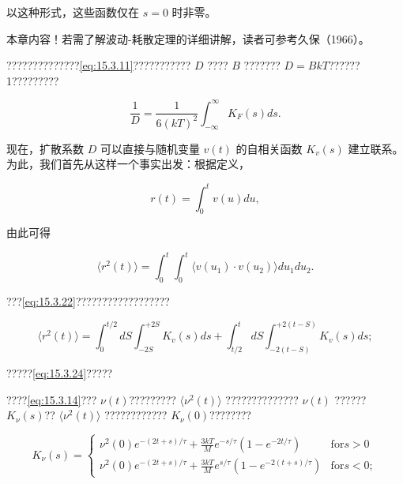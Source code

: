 以这种形式，这些函数仅在 \(s=0\) 时非零。

本章内容！若需了解波动-耗散定理的详细讲解，读者可参考久保（1966）。

??????????????\autoref{eq:15.3.11}??????????? \(D\) ???? \(B\) ??????? \(D = BkT\)??????1?????????

\begin{equation}\tag{15.4.56}\label{eq:15.4.56}
\frac { 1 } { D } = \frac { 1 } { 6 ( k T ) ^{2} } \int _ { - \infty } ^{\infty} K _ { F } ( s ) d s .
\end{equation}

现在，扩散系数 \(D\) 可以直接与随机变量 \(v(t)\) 的自相关函数 \(K_{v}(s)\) 建立联系。为此，我们首先从这样一个事实出发：根据定义，

\begin{equation}\tag{15.4.57}\label{eq:15.4.57}
r ( t ) = \int _ { 0 } ^{t} v ( u ) d u ,
\end{equation}

由此可得

\begin{equation}\tag{15.4.58}\label{eq:15.4.58}
\langle r ^{2} ( t ) \rangle = \int _ { 0 } ^{t} \int _ { 0 } ^{t} \langle v ( u _ { 1 } ) \cdot v ( u _ { 2 } ) \rangle d u _ { 1 } d u _ { 2 } .
\end{equation}

???\autoref{eq:15.3.22}??????????????????

\begin{equation}\tag{15.4.59}\label{eq:15.4.59}
\langle r ^{2} ( t ) \rangle = \int _ { 0 } ^{t / 2} d S \int _ { - 2 S } ^{+ 2 S} K _ { v } ( s ) d s + \int _ { t / 2 } ^{t} d S \int _ { - 2 ( t - S ) } ^{+ 2 ( t - S )} K _ { v } ( s ) d s ;
\end{equation}

?????\autoref{eq:15.3.24}?????

????\autoref{eq:15.3.14}??? \(\nu(t)\)????????? \(\langle\nu^{2}(t)\rangle\) ?????????????? \(\nu(t)\) ?????? \(K_{\nu}(s)\)?? \(\langle\nu^{2}(t)\rangle\) ???????????? \(K_{\nu}(0)\)????????

\begin{equation}\tag{15.4.60}\label{eq:15.4.60}
K _ { \nu } ( s ) = \left\{ \begin{array}{ll} { \nu ^{2} ( 0 ) e ^{- ( 2 t + s ) / \tau} + \frac { 3 k T } { M } e ^{- s / \tau} \left( 1 - e ^{- 2 t / \tau} \right) } & {  \mathrm { f o r }  s > 0 } \\{ \nu ^{2} ( 0 ) e ^{- ( 2 t + s ) / \tau} + \frac { 3 k T } { M } e ^{s / \tau} \left( 1 - e ^{- 2 ( t + s ) / \tau} \right) } & {  \mathrm { f o r }  s < 0 ; } \end{array} \right.
\end{equation}


